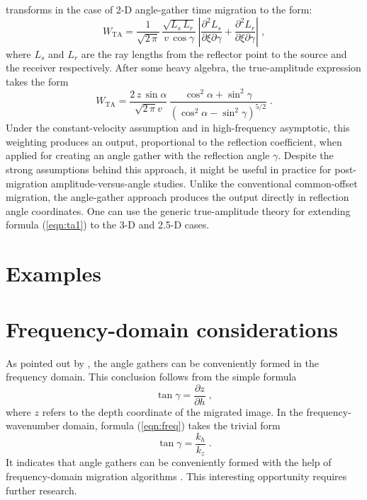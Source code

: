 \cite{Fomel.sep.92.267} transforms in the case of 2-D angle-gather
time migration to the form:
\begin{equation}
  \label{eqn:ta}
  W_{\mbox{TA}} = \frac{1}{\sqrt{2\,\pi}}\,
  \frac{\sqrt{L_s\,L_r}}{v\,\cos{\gamma}}\,
  \left|\frac{\partial^2 L_s}{\partial \xi \partial \gamma} +
    \frac{\partial^2 L_r}{\partial \xi \partial \gamma} 
  \right|\;,  
\end{equation}
where $L_s$ and $L_r$ are the ray lengths from the reflector point to
the source and the receiver respectively. After some heavy algebra,
the true-amplitude expression takes the form
\begin{equation}
  \label{eqn:ta1}
  W_{\mbox{TA}} = \frac{2\,z\,\sin{\alpha}}{\sqrt{2\,\pi} v}\,
  \frac{\cos^2{\alpha} + \sin^2{\gamma}}
  {\left(\cos^2{\alpha} - \sin^2{\gamma}\right)^{5/2}}\;.
\end{equation}
Under the constant-velocity assumption and in high-frequency
asymptotic, this weighting produces an output, proportional to the
reflection coefficient, when applied for creating an angle gather with
the reflection angle $\gamma$. Despite the strong assumptions behind
this approach, it might be useful in practice for post-migration
amplitude-versus-angle studies. Unlike the conventional common-offset
migration, the angle-gather approach produces the output directly in
reflection angle coordinates. One can use the generic true-amplitude
theory \cite{Fomel.sep.92.267} for extending formula (\ref{eqn:ta1})
to the 3-D and 2.5-D cases.

\section{Examples}



\section{Frequency-domain considerations}

As pointed out by , the angle gathers
can be conveniently formed in the frequency domain. This conclusion
follows from the simple formula \cite{Fomel.sep.92.159}
\begin{equation}
  \label{eqn:freq}
  \tan{\gamma} = \frac{\partial z}{\partial h}\;,
\end{equation}
where $z$ refers to the depth coordinate of the migrated image. In the
frequency-wavenumber domain, formula (\ref{eqn:freq}) takes the
trivial form
\begin{equation}
  \label{eqn:freq1}
  \tan{\gamma} = \frac{k_h}{k_z}\;.
\end{equation}
It indicates that angle gathers can be conveniently formed with the help
of frequency-domain migration algorithms \cite{GEO43.01.00230048}.
This interesting opportunity requires further research.

